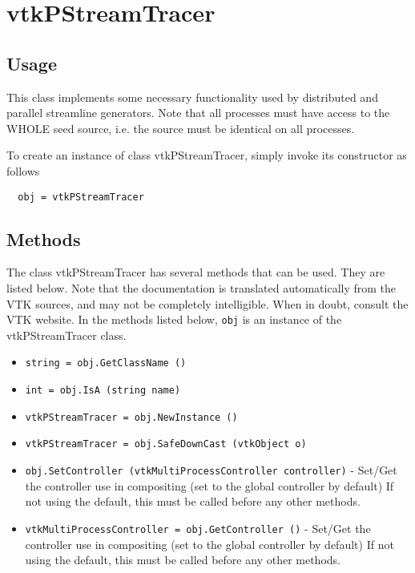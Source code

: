 \section{vtkPStreamTracer}

\subsection{Usage}

 This class implements some necessary functionality used by distributed
 and parallel streamline generators. Note that all processes must have
 access to the WHOLE seed source, i.e. the source must be identical
 on all processes.

To create an instance of class vtkPStreamTracer, simply
invoke its constructor as follows
\begin{verbatim}
  obj = vtkPStreamTracer
\end{verbatim}
\subsection{Methods}

The class vtkPStreamTracer has several methods that can be used.
  They are listed below.
Note that the documentation is translated automatically from the VTK sources,
and may not be completely intelligible.  When in doubt, consult the VTK website.
In the methods listed below, \verb|obj| is an instance of the vtkPStreamTracer class.
\begin{itemize}
\item  \verb|string = obj.GetClassName ()|

\item  \verb|int = obj.IsA (string name)|

\item  \verb|vtkPStreamTracer = obj.NewInstance ()|

\item  \verb|vtkPStreamTracer = obj.SafeDownCast (vtkObject o)|

\item  \verb|obj.SetController (vtkMultiProcessController controller)| -  Set/Get the controller use in compositing (set to
 the global controller by default)
 If not using the default, this must be called before any
 other methods.

\item  \verb|vtkMultiProcessController = obj.GetController ()| -  Set/Get the controller use in compositing (set to
 the global controller by default)
 If not using the default, this must be called before any
 other methods.

\end{itemize}
